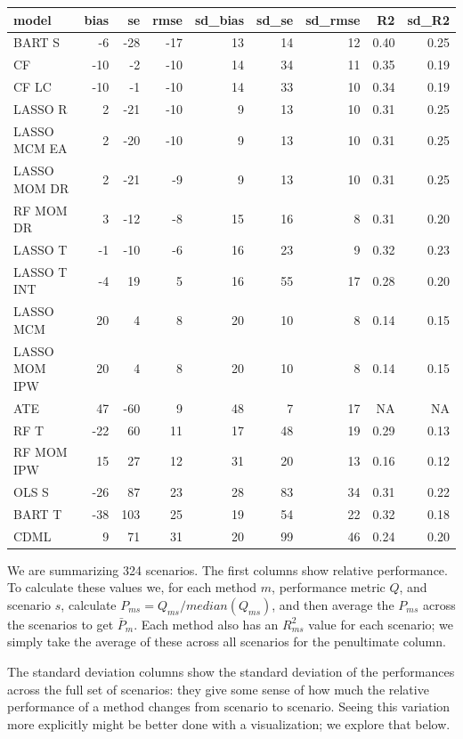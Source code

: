 \documentclass[
]{book}
\begin{document}
\begin{tabular}{l|r|r|r|r|r|r|r|r}
\hline
model & bias & se & rmse & sd\_bias & sd\_se & sd\_rmse & R2 & sd\_R2\\
\hline
BART S & -6 & -28 & -17 & 13 & 14 & 12 & 0.40 & 0.25\\
\hline
CF & -10 & -2 & -10 & 14 & 34 & 11 & 0.35 & 0.19\\
\hline
CF LC & -10 & -1 & -10 & 14 & 33 & 10 & 0.34 & 0.19\\
\hline
LASSO R & 2 & -21 & -10 & 9 & 13 & 10 & 0.31 & 0.25\\
\hline
LASSO MCM EA & 2 & -20 & -10 & 9 & 13 & 10 & 0.31 & 0.25\\
\hline
LASSO MOM DR & 2 & -21 & -9 & 9 & 13 & 10 & 0.31 & 0.25\\
\hline
RF MOM DR & 3 & -12 & -8 & 15 & 16 & 8 & 0.31 & 0.20\\
\hline
LASSO T & -1 & -10 & -6 & 16 & 23 & 9 & 0.32 & 0.23\\
\hline
LASSO T INT & -4 & 19 & 5 & 16 & 55 & 17 & 0.28 & 0.20\\
\hline
LASSO MCM & 20 & 4 & 8 & 20 & 10 & 8 & 0.14 & 0.15\\
\hline
LASSO MOM IPW & 20 & 4 & 8 & 20 & 10 & 8 & 0.14 & 0.15\\
\hline
ATE & 47 & -60 & 9 & 48 & 7 & 17 & NA & NA\\
\hline
RF T & -22 & 60 & 11 & 17 & 48 & 19 & 0.29 & 0.13\\
\hline
RF MOM IPW & 15 & 27 & 12 & 31 & 20 & 13 & 0.16 & 0.12\\
\hline
OLS S & -26 & 87 & 23 & 28 & 83 & 34 & 0.31 & 0.22\\
\hline
BART T & -38 & 103 & 25 & 19 & 54 & 22 & 0.32 & 0.18\\
\hline
CDML & 9 & 71 & 31 & 20 & 99 & 46 & 0.24 & 0.20\\
\hline
\end{tabular}

We are summarizing 324 scenarios.
The first columns show relative performance.
To calculate these values we, for each method \(m\), performance metric \(Q\), and scenario \(s\), calculate \(P_{ms} = Q_{ms} / median( Q_{ms} )\), and then average the \(P_{ms}\) across the scenarios to get \(\bar{P}_m\).
Each method also has an \(R^2_{ms}\) value for each scenario; we simply take the average of these across all scenarios for the penultimate column.

The standard deviation columns show the standard deviation of the performances across the full set of scenarios: they give some sense of how much the relative performance of a method changes from scenario to scenario.
Seeing this variation more explicitly might be better done with a visualization; we explore that below.
\end{document}
